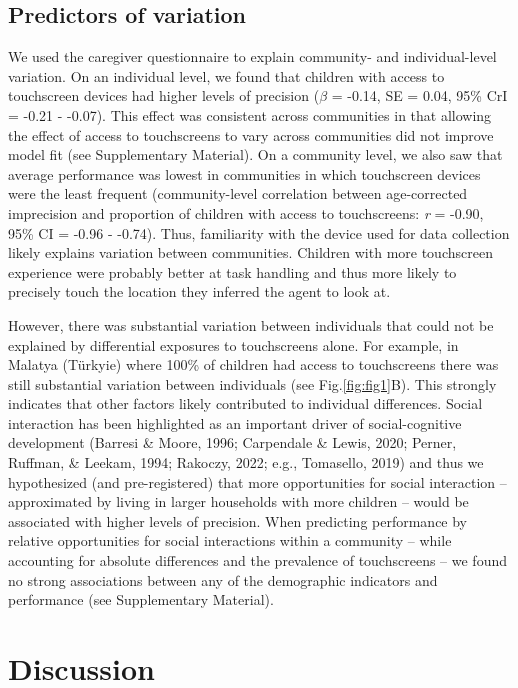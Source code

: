 \documentclass[
  man,floatsintext]{apa6}
\begin{document}
\hypertarget{predictors-of-variation}{%
\subsection{Predictors of variation}\label{predictors-of-variation}}

We used the caregiver questionnaire to explain community- and individual-level variation. On an individual level, we found that children with access to touchscreen devices had higher levels of precision (\(\beta\) = -0.14, SE = 0.04, 95\% CrI = -0.21 - -0.07). This effect was consistent across communities in that allowing the effect of access to touchscreens to vary across communities did not improve model fit (see Supplementary Material). On a community level, we also saw that average performance was lowest in communities in which touchscreen devices were the least frequent (community-level correlation between age-corrected imprecision and proportion of children with access to touchscreens: \emph{r} = -0.90, 95\% CI = -0.96 - -0.74). Thus, familiarity with the device used for data collection likely explains variation between communities. Children with more touchscreen experience were probably better at task handling and thus more likely to precisely touch the location they inferred the agent to look at.

However, there was substantial variation between individuals that could not be explained by differential exposures to touchscreens alone. For example, in Malatya (Türkyie) where 100\% of children had access to touchscreens there was still substantial variation between individuals (see Fig.\ref{fig:fig1}B). This strongly indicates that other factors likely contributed to individual differences. Social interaction has been highlighted as an important driver of social-cognitive development (Barresi \& Moore, 1996; Carpendale \& Lewis, 2020; Perner, Ruffman, \& Leekam, 1994; Rakoczy, 2022; e.g., Tomasello, 2019) and thus we hypothesized (and pre-registered) that more opportunities for social interaction -- approximated by living in larger households with more children -- would be associated with higher levels of precision. When predicting performance by relative opportunities for social interactions within a community -- while accounting for absolute differences and the prevalence of touchscreens -- we found no strong associations between any of the demographic indicators and performance (see Supplementary Material).

\hypertarget{discussion}{%
\section{Discussion}\label{discussion}}
\end{document}
